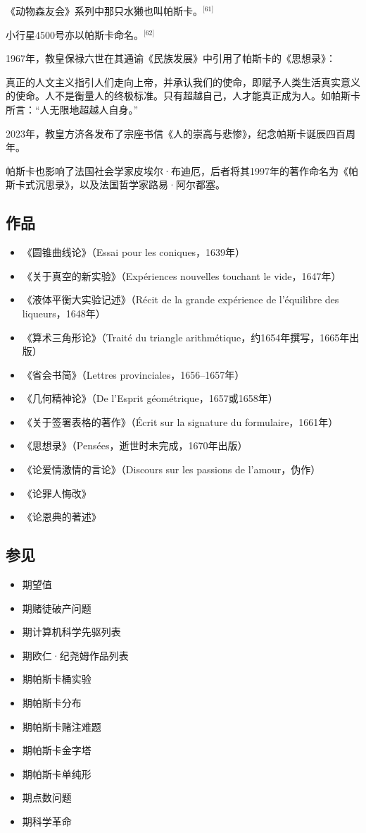 《动物森友会》系列中那只水獭也叫帕斯卡。\(^\text{[61]}\)

小行星4500号亦以帕斯卡命名。\(^\text{[62]}\)

1967年，教皇保禄六世在其通谕《民族发展》中引用了帕斯卡的《思想录》：

真正的人文主义指引人们走向上帝，并承认我们的使命，即赋予人类生活真实意义的使命。人不是衡量人的终极标准。只有超越自己，人才能真正成为人。如帕斯卡所言：“人无限地超越人自身。”

2023年，教皇方济各发布了宗座书信《人的崇高与悲惨》，纪念帕斯卡诞辰四百周年。

帕斯卡也影响了法国社会学家皮埃尔·布迪厄，后者将其1997年的著作命名为《帕斯卡式沉思录》，以及法国哲学家路易·阿尔都塞。
\subsection{作品}
\begin{itemize}
\item 《圆锥曲线论》（Essai pour les coniques，1639年）
\item 《关于真空的新实验》（Expériences nouvelles touchant le vide，1647年）
\item 《液体平衡大实验记述》（Récit de la grande expérience de l'équilibre des liqueurs，1648年）
\item 《算术三角形论》（Traité du triangle arithmétique，约1654年撰写，1665年出版）
\item 《省会书简》（Lettres provinciales，1656–1657年）
\item 《几何精神论》（De l'Esprit géométrique，1657或1658年）
\item 《关于签署表格的著作》（Écrit sur la signature du formulaire，1661年）
\item 《思想录》（Pensées，逝世时未完成，1670年出版）
\item 《论爱情激情的言论》（Discours sur les passions de l'amour，伪作）
\item 《论罪人悔改》
\item 《论恩典的著述》
\end{itemize}
\subsection{参见}
\begin{itemize}
\item 期望值
\item 期赌徒破产问题
\item 期计算机科学先驱列表
\item 期欧仁·纪尧姆作品列表
\item 期帕斯卡桶实验
\item 期帕斯卡分布
\item 期帕斯卡赌注难题
\item 期帕斯卡金字塔
\item 期帕斯卡单纯形
\item 期点数问题
\item 期科学革命
\end{itemize}
